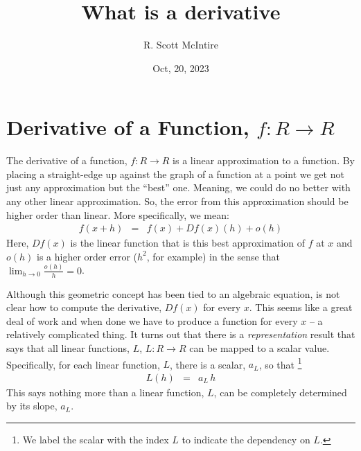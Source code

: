 \documentclass{article}
\title{What is a derivative}
\author{R. Scott McIntire}
\date{Oct, 20, 2023}
\begin{document}
\maketitle

\section{Derivative of a Function, $f: R\rightarrow R$}
The derivative of a function, $f : R \rightarrow R$ is a linear approximation to
a function. By placing a straight-edge up against the graph of a function at
a point we get not just any approximation but the ``best''{} one. Meaning,
we could do no better with any other linear approximation. So, the error
from this approximation should be higher order than linear. More specifically,
we mean:
\begin{eqnarray}
f(x + h) & = & f(x) + Df(x)(h) + o(h) \label{simderdef}
\end{eqnarray}
Here, $Df(x)$ is the linear function that is this best approximation of $f$ at $x$
and $o(h)$ is a higher order error ($h^2$, for example) in the sense that
$\lim_{h\rightarrow 0} \frac{o(h)}{h} = 0$.

Although this geometric concept has been tied to an algebraic equation,
is not clear how to compute the derivative, $Df(x)$ for every $x$. This seems
like a great deal of work and when done we have to produce a function for
every $x$ -- a relatively complicated thing. It turns out that there is a
{\em representation\/} result	 that says that all linear functions, $L$,
$L: R \rightarrow R$ can be mapped to a scalar value.
Specifically, for each linear function, $L$, there is a scalar, $a_L$, so that%
\footnote{We label the scalar with the index $L$ to indicate the dependency on $L$.}
\begin{eqnarray}
  L(h) & = & a_L \, h
\end{eqnarray}
This says nothing more than a linear function, $L$, can be completely determined
by its slope, $a_L$.
\end{document}

